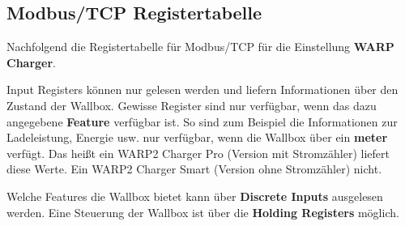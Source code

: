 \documentclass[a4paper,10pt]{article}
\begin{document}
\begin{multicols*}{2}
	\vfill
	\null

	\columnbreak
\appendix

\section{Modbus/TCP Registertabelle}
\label{modbus_tcp_registertabelle}
Nachfolgend die Registertabelle für Modbus/TCP für die Einstellung \textbf{WARP
Charger}.

Input Registers können nur gelesen werden und liefern Informationen über den
Zustand der Wallbox. Gewisse Register sind nur verfügbar, wenn das dazu
angegebene \textbf{Feature} verfügbar ist. So sind zum Beispiel die
Informationen zur Ladeleistung, Energie usw. nur verfügbar, wenn die Wallbox
über ein \textbf{meter} verfügt. Das heißt ein WARP2 Charger Pro (Version mit
Stromzähler) liefert diese Werte. Ein WARP2 Charger Smart (Version ohne
Stromzähler) nicht.

Welche Features die Wallbox bietet kann über \textbf{Discrete Inputs} ausgelesen
werden. Eine Steuerung der Wallbox ist über die \textbf{Holding Registers}
möglich.

\end{multicols*}
\end{document}
